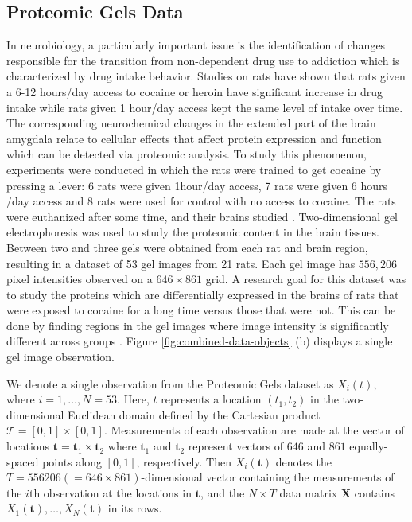 \subsection{Proteomic Gels Data}

In neurobiology, a particularly important issue is the identification of changes responsible for the transition from non-dependent drug use to addiction which is characterized by drug intake behavior. Studies on rats have shown that rats given a 6-12 hours/day access to cocaine or heroin have significant increase in drug intake while rats given 1 hour/day access kept the same level of intake over time.
The corresponding neurochemical changes in the extended part of the brain amygdala relate to cellular effects that affect protein expression and function which can be detected via proteomic analysis. To study this phenomenon, experiments were conducted in which the rats were trained to get cocaine by pressing a lever: 6 rats were given 1hour/day access, 7 rats were given 6 hours /day access and 8 rats were used for control with no access to cocaine. The rats were euthanized after some time, and their brains studied \parencite{morris_pinnacle_2008}. 
Two-dimensional gel electrophoresis was used to study the proteomic content in the brain tissues. 
Between two and three gels were obtained from each rat and brain region, resulting in a dataset of 53 gel images from 21 rats.
Each gel image has $556,206$ pixel intensities observed on a $646 \times 861$ grid. 
A research goal for this dataset was to study the proteins which are differentially expressed in the brains of rats that were exposed to cocaine for a long time versus those that were not.
This can be done by finding regions in the gel images where image intensity is significantly different across groups \parencite{morris_statistical_2012}. 
Figure \ref{fig:combined-data-objects} (b) displays a single gel image observation.

We denote a single observation from the Proteomic Gels dataset as $X_i(t)$, where $i=1, \dots, N = 53$.
Here, $t$ represents a location $(t_1, t_2)$ in the two-dimensional Euclidean domain defined by the Cartesian product $\mathcal{T} = [0, 1] \times [0, 1]$.
Measurements of each observation are made at the vector of locations $\mathbf{t} = \mathbf{t}_1 \times \mathbf{t}_2$ where $\mathbf{t}_1$ and $\mathbf{t}_2$ represent vectors of $646$ and $861$ equally-spaced points along $[0, 1]$, respectively.
Then $X_i (\mathbf{t})$ denotes the $T = 556206 ( = 646 \times 861)$-dimensional vector containing the measurements of the $i$th observation at the locations in $\mathbf{t}$, and the $N \times T$ data matrix $\mathbf{X}$ contains $X_1 (\mathbf{t}), \dots, X_N (\mathbf{t})$ in its rows.

